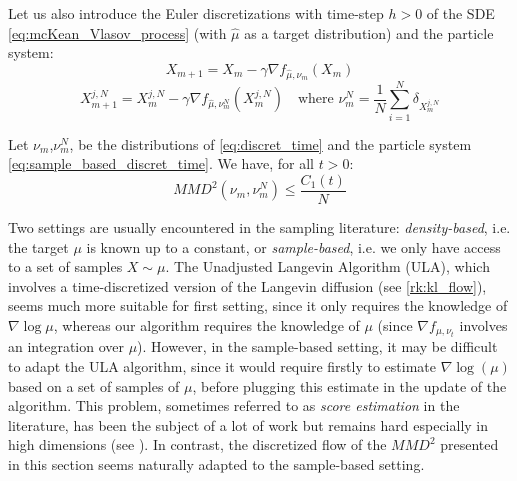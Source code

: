 Let us also introduce the Euler discretizations with time-step $h > 0$ of the SDE \eqref{eq:mcKean_Vlasov_process} (with $\widehat{ \mu}$ as a target distribution) and the particle system:
\begin{equation}\label{eq:discret_time}
X_{m+1}=X_m - \gamma \nabla f_{\widehat{\mu}, \nu_m}(X_m) \end{equation}
\begin{equation}\label{eq:sample_based_discret_time}
X_{m+1}^{j,N}=X_{m}^{j,N}- \gamma \nabla f_{\widehat{\mu}, \nu_m^N}(X_m^{j,N}) \quad \text{where } \nu_m^N=\frac{1}{N} \sum_{i=1}^N \delta_{X_m^{j,N}}
\end{equation}
\begin{proposition}%
	Let $\nu_m$,$\nu_m^N$, be the distributions of \eqref{eq:discret_time} and the particle system \eqref{eq:sample_based_discret_time}. We have, for all $t>0$:
	\begin{equation}
	MMD^2(\nu_m,\nu_m^N)\le \frac{C_1(t)}{N}
	\end{equation}
\end{proposition}

\begin{remark}
	Two settings are usually encountered in the sampling literature: \textit{density-based}, i.e. the target $\mu$ is known up to a constant, or \textit{sample-based}, i.e. we only have access to a set of samples $X \sim \mu$.
	The Unadjusted Langevin Algorithm (ULA), which involves a time-discretized version of the Langevin diffusion (see \cref{rk:kl_flow}), seems much more suitable for first setting, since it only requires the knowledge of $\nabla \log \mu$, whereas our algorithm requires the knowledge of $\mu$ (since $\nabla f_{\mu, \nu_t}$ involves an integration over $\mu$). However, in the sample-based setting, it may be difficult to adapt the ULA algorithm, since it would require firstly to estimate $\nabla \log(\mu)$ based on a set of samples of $\mu$, before plugging this estimate in the update of the algorithm. This problem, sometimes referred to as \textit{score estimation} in the literature, has been the subject of a lot of work but remains hard especially in high dimensions (see \cite{sutherland2017efficient,li2018gradient,shi2018spectral}). In contrast, the discretized flow of the $MMD^2$ presented in this section seems naturally adapted to the sample-based setting.
\end{remark}